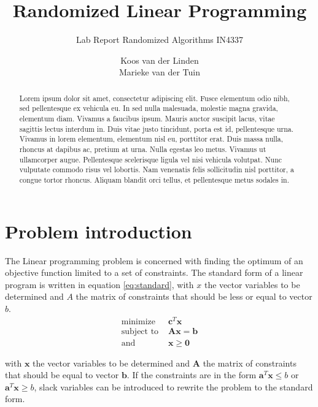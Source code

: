\documentclass[nocopyrightspace]{acm_proc_article-sp}
\begin{document}
\title{Randomized Linear Programming}
\subtitle{Lab Report Randomized Algorithms IN4337}
\author{
\alignauthor
Koos van der Linden \\ 
\alignauthor
Marieke van der Tuin \\ 
}
\maketitle
\begin{abstract}
Lorem ipsum dolor sit amet, consectetur adipiscing elit. Fusce elementum odio nibh, sed pellentesque ex vehicula eu. In sed nulla malesuada, molestie magna gravida, elementum diam. Vivamus a faucibus ipsum. Mauris auctor suscipit lacus, vitae sagittis lectus interdum in. Duis vitae justo tincidunt, porta est id, pellentesque urna. Vivamus in lorem elementum, elementum nisl eu, porttitor erat. Duis massa nulla, rhoncus at dapibus ac, pretium at urna. Nulla egestas leo metus. Vivamus ut ullamcorper augue. Pellentesque scelerisque ligula vel nisi vehicula volutpat. Nunc vulputate commodo risus vel lobortis. Nam venenatis felis sollicitudin nisl porttitor, a congue tortor rhoncus. Aliquam blandit orci tellus, et pellentesque metus sodales in. 
\end{abstract}

\section{Problem introduction}
The Linear programming problem is concerned with finding the optimum of an objective function limited to a set of constraints. The standard form of a linear program is written in equation \ref{eq:standard}, with $x$ the vector variables to be determined and $A$ the matrix of constraints that should be less or equal to vector $b$.
\begin{equation}
\label{eq:standard}
\begin{split}
\text{minimize } & \mathbf{c}^T \mathbf{x} \\
\text{subject to } &  \mathbf{Ax} = \mathbf{b} \\
\text{and } & \mathbf{x} \geq \mathbf{0}
\end{split}
\end{equation}

with $\mathbf{x}$ the vector variables to be determined and $\mathbf{A}$ the matrix of constraints that should be equal to vector $\mathbf{b}$. If the constraints are in the form $\mathbf{a}^T \mathbf{x} \leq b$ or $\mathbf{a}^T \mathbf{x} \geq b$, slack variables can be introduced to rewrite the problem to the standard form. 
\end{document}
